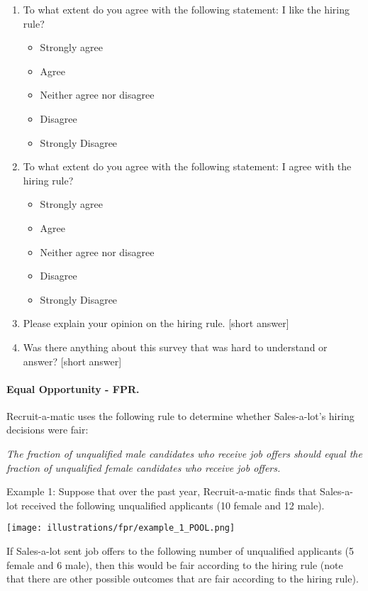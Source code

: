 \documentclass{article}
\begin{document}
\begin{enumerate}
\item To what extent do you agree with the following statement: I like the hiring rule?
\begin{itemize}
    \item Strongly agree
    \item Agree
    \item Neither agree nor disagree
    \item Disagree
    \item Strongly Disagree
\end{itemize}

\item To what extent do you agree with the following statement: I agree with the hiring rule?
\begin{itemize}
    \item Strongly agree
    \item Agree
    \item Neither agree nor disagree
    \item Disagree
    \item Strongly Disagree
\end{itemize}

\item Please explain your opinion on the hiring rule. [short answer]

\item Was there anything about this survey that was hard to understand or answer? [short answer]
\end{enumerate}

\paragraph{Equal Opportunity - FPR.}
Recruit-a-matic uses the following rule to determine whether Sales-a-lot’s hiring decisions were fair:
 
\emph{The fraction of unqualified male candidates who receive job offers should equal the fraction of unqualified female candidates who receive job offers.}

Example 1: Suppose that over the past year, Recruit-a-matic finds that Sales-a-lot received the following unqualified applicants (10 female and 12 male).

\texttt{[image: illustrations/fpr/example\_1\_POOL.png]}

If Sales-a-lot sent job offers to the following number of unqualified applicants (5 female and 6 male), then this would be fair according to the hiring rule (note that there are other possible outcomes that are fair according to the hiring rule).
\end{document}

